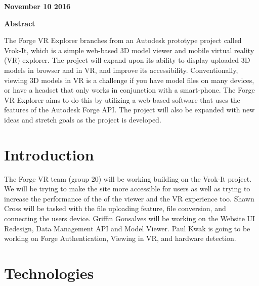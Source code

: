 \documentclass[letterpaper, 10pt, draftclsnofoot, compsoc, onecolumn]{IEEEtran}
\begin{document}
{\centering{}\bfseries\color{black}
November 10 2016
\par}
\bigskip
\bigskip
\bigskip
\bigskip
\bigskip
\bigskip
\bigskip
\bigskip
\bigskip
\bigskip
\bigskip
\bigskip


\vfill
{\centering{}\bfseries\color{black}
Abstract
\par}

{\centering{}\mdseries\color{black}
	The Forge VR Explorer branches from an Autodesk prototype project called Vrok-It, which is a simple web-based 3D 
	model viewer and mobile virtual reality (VR) explorer. The project will expand upon its ability to display uploaded 3D 
	models in browser and in VR, and improve its accessibility. Conventionally, viewing 3D models in VR is a challenge if 
	you have model files on many devices, or have a headset that only works in conjunction with a smart-phone. The 
	Forge VR Explorer aims to do this by utilizing a web-based software that uses the features of the Autodesk Forge API. 
	The project will also be expanded with new ideas and stretch goals as the project is developed.
\par}
\clearpage

\section{Introduction}
	The Forge VR team (group 20) will be working building on the Vrok-It project. We will be trying to make the site more accessible for users
	as well as trying to increase the performance of the  of the viewer and the VR experience too. Shawn Cross will be tasked with the file
	uploading feature, file conversion, and connecting the users device. Griffin Gonsalves will be working on the Website UI Redesign, Data Management API
	and Model Viewer. Paul Kwak is going to be working on Forge Authentication, Viewing in VR, and hardware detection.
	
\section{Technologies}
\end{document}
